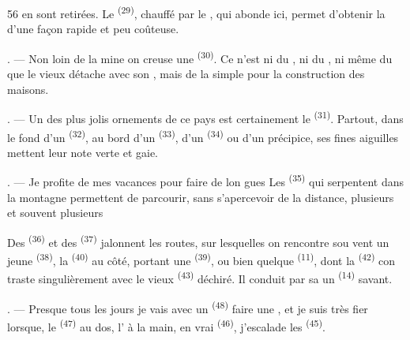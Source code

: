 \begin{VUpage}[58]{56}
\VUcontinue
en sont retirées. Le  \textsuperscript{(29)}, chauffé par\nl
le , qui abonde ici, permet d'obtenir\nl
la  d'une façon rapide et peu coûteuse.

. --- Non loin de la mine on creuse une \cc
{} \textsuperscript{(30)}. Ce n'est ni du , ni du , ni\nl
même du  que le vieux  détache avec\nl
son , mais de la simple  pour la\nl
construction des maisons.

. --- Un des plus jolis ornements de ce pays est\nl
certainement le  \textsuperscript{(31)}. Partout, dans le fond d'un\nl
{} \textsuperscript{(32)}, au bord d'un  \textsuperscript{(33)}, d'un  \textsuperscript{(34)}\nl
ou d'un précipice, ses fines aiguilles mettent leur\nl
note verte et gaie.

. --- Je profite de mes vacances pour faire de lon\cc
gues  Les  \textsuperscript{(35)} qui serpentent\nl
dans la montagne permettent de parcourir, sans\nl
s'apercevoir de la distance, plusieurs \nl
et souvent plusieurs 

\VUblancAlinea
Des  \textsuperscript{(36)} et des  \textsuperscript{(37)}\nl
jalonnent les routes, sur lesquelles on rencontre sou\cc
vent un jeune  \textsuperscript{(38)}, la  \textsuperscript{(40)} au\nl
côté, portant une  \textsuperscript{(39)}, ou bien quelque\nl
{} \textsuperscript{(11)}, dont la  \textsuperscript{(42)} con\cc
traste singulièrement avec le vieux  \textsuperscript{(43)}\nl
déchiré. Il conduit par sa  un  \textsuperscript{(14)} savant.

. --- Presque tous les jours je vais avec un\nl
{} \textsuperscript{(48)} faire une , et je suis très fier\nl
lorsque, le  \textsuperscript{(47)} au dos, l' à la main,\nl
en vrai  \textsuperscript{(46)}, j'escalade les  \textsuperscript{(45)}.


\end{VUpage}
